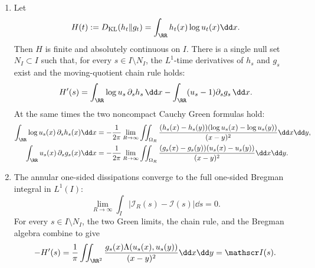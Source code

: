 \begin{proposition}[Bounded Lipschitz quotient implies \(H'=-I\)]
\begin{enumerate}
\item Let
\[
H(t):=D_{\mathrm{KL}}(h_t\|g_t)
=\int_{\RR}h_t(x)\log u_t(x)\dd x .
\]
Then \(H\) is finite and absolutely continuous on \(I\).  There is a single
null set \(N_I\subset I\) such that, for every \(s\in I\setminus N_I\), the
\(L^1\)-time derivatives of \(h_s\) and \(g_s\) exist and the moving-quotient
chain rule holds:
\begin{equation}\label{eq:compact-window-chain-rule-single-null-set}
H'(s)=\int_{\RR}\log u_s\,\partial_sh_s\,\dd x
-\int_{\RR}(u_s-1)\partial_sg_s\,\dd x .
\end{equation}
At the same times the two noncompact Cauchy Green formulas hold:
\begin{align}
\int_{\RR}\log u_s(x)\,\partial_sh_s(x)\dd x
&=-\frac{1}{2\pi}\lim_{R\to\infty}
\iint_{\Omega_R}
\frac{(h_s(x)-h_s(y))(\log u_s(x)-\log u_s(y))}
{(x-y)^2}\dd x\dd y, \label{eq:compact-window-h-logu-green}\\
\int_{\RR}u_s(x)\,\partial_sg_s(x)\dd x
&=-\frac{1}{2\pi}\lim_{R\to\infty}
\iint_{\Omega_R}
\frac{(g_s(x)-g_s(y))(u_s(x)-u_s(y))}
{(x-y)^2}\dd x\dd y. \label{eq:compact-window-g-u-green}
\end{align}

\item The annular one-sided dissipations converge to the full one-sided
Bregman integral in \(L^1(I)\):
\begin{equation}\label{eq:compact-window-annular-l1-convergence}
\lim_{R\to\infty}\int_I
\left|\mathscr I_R(s)-\mathscr I(s)\right|\dd s=0.
\end{equation}
For every \(s\in I\setminus N_I\), the two Green limits, the chain rule, and
the Bregman algebra combine to give
\begin{equation}\label{eq:compact-window-bregman-derivative}
-H'(s)
=\frac1\pi\iint_{\RR^2}
\frac{g_s(x)\Lambda(u_s(x),u_s(y))}{(x-y)^2}\dd x\dd y
=\mathscr I(s).
\end{equation}
\end{enumerate}
\end{proposition}

